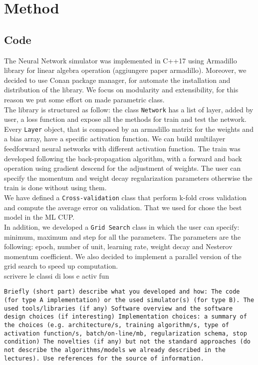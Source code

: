 \section{Method}

\subsection{Code}
The Neural Network simulator was implemented in C++17 using Armadillo library for linear algebra operation (aggiungere paper armadillo). Moreover, we decided to use Conan package manager, for automate the installation and distribution of the library. We focus on modularity and extensibility, for this reason we put some effort on made parametric class.
\\
The library is structured as follow:
the class \texttt{Network} has a list of layer, added by user, a loss function and expose all the methods for train and test the network. Every \texttt{Layer} object, that is composed by an armadillo matrix for the weights and a bias array, have a specific activation function. We can build  multilayer feedforward neural networks with different activation function. The train was developed following the back-propagation algorithm, with a forward and back operation using gradient descend for the adjustment of weights. The user can specify the momentum and weight decay regularization parameters otherwise the train is done without using them. 
\\
We have defined a \texttt{Cross-validation} class that perform k-fold cross validation and compute the average error on validation. That we used for chose the best model in the ML CUP.
\\
In addition, we developed a \texttt{Grid Search} class in which the user can specify: minimum, maximum and step for all the parameters. The parameters are the following: epoch, number of unit, learning rate, weight decay and Nesterov momentum coefficient. We also decided to implement a parallel version of the grid search to speed up computation. 
\\
scrivere le classi di loss e activ fun

\texttt{Briefly (short part) describe what you developed and how: 
 The code (for type A implementation) or the used simulator(s) (for type B). 
 The used tools/libraries (if any)
 Software overview and the software design choices (if interesting)
 Implementation choices: a  summary of the choices (e.g. architecture/s, training algorithm/s, type of activation function/s, batch/on-line/mb, regularization schema, stop condition)
 The novelties (if any) but not the standard approaches (do not describe the algorithms/models we already described in the lectures). Use references for the source of information. }

